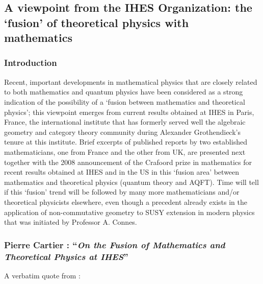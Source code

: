\documentclass[12pt]{article}
\theoremstyle{plain}
\theoremstyle{definition}
\numberwithin{equation}{section}
\begin{document}
\subsection{A viewpoint from the IHES Organization: the `fusion' of theoretical physics with mathematics}

\subsubsection{Introduction}
Recent, important developments in mathematical physics that are closely related to both mathematics and quantum physics have been considered as a strong indication of the possibility of a `fusion between mathematics
and theoretical physics'; this viewpoint emerges from current results obtained at IHES in Paris, France,
the international institute that has formerly served well the algebraic geometry and category theory community
during Alexander Grothendieck's tenure at this institute. Brief excerpts of published reports by two established
mathematicians, one from France and the other from UK, are presented next together with the 2008 announcement
of the Crafoord prize in mathematics for recent results obtained at IHES and in the US in this `fusion area' between mathematics and theoretical physics (quantum theory and AQFT). Time will tell if this `fusion' trend will be followed by many more mathematicians and/or theoretical physicists elsewhere, even though a precedent already exists in the application of non-commutative geometry to SUSY extension in modern physics that was initiated by Professor A. Connes.

\subsubsection{Pierre Cartier : ``{\em On the Fusion of Mathematics and Theoretical Physics at IHES}''}

A verbatim quote from : 

\end{document}
